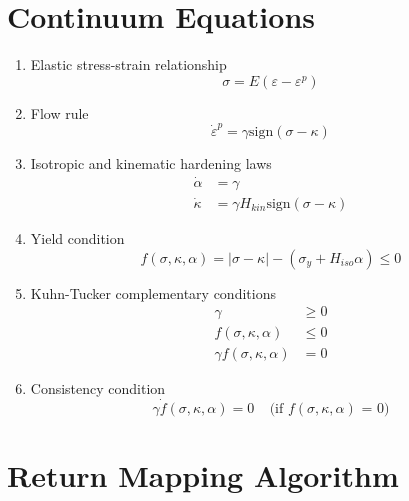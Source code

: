 \documentclass[12pt]{article}
\begin{document}
\section*{Continuum Equations}

\begin{enumerate}
\item{} Elastic stress-strain relationship
\begin{equation}
\sigma = E \left( \varepsilon-\varepsilon^p \right)
\end{equation}

\item{} Flow rule
\begin{equation}
\dot{\varepsilon}^p = \gamma \mbox{sign}\left( \sigma-\kappa \right)
\end{equation}

\item{} Isotropic and kinematic hardening laws
\begin{align}
\dot{\alpha} &= \gamma \\
\dot{\kappa} &= \gamma H_{kin} \mbox{sign}\left( \sigma-\kappa \right)
\end{align}

\item{} Yield condition
\begin{equation}
f(\sigma, \kappa, \alpha) = \left| \sigma-\kappa \right| -
\left( \sigma_y + H_{iso}\alpha \right) \leq 0
\end{equation}

\item{} Kuhn-Tucker complementary conditions
\begin{align}
\gamma &\geq 0 \\
f(\sigma, \kappa, \alpha) &\leq 0 \\
\gamma f(\sigma, \kappa, \alpha) &= 0
\end{align}

\item{} Consistency condition
\begin{equation}
\gamma \dot{f}(\sigma, \kappa, \alpha) = 0 \:\:\:\:\:
\mbox{(if $f(\sigma, \kappa, \alpha)$ = 0)}
\end{equation}

\end{enumerate}

\section*{Return Mapping Algorithm}
\end{document}
